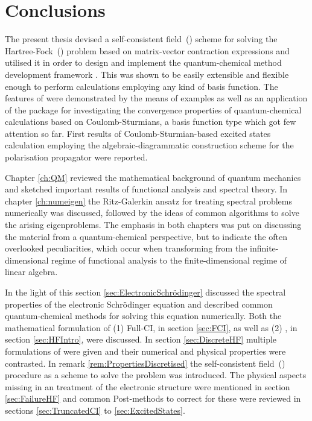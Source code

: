 \chapter{Conclusions}
\label{ch:Conclusion}

\noindent
The present thesis devised a self-consistent field~(\SCF)
scheme for solving the Hartree-Fock~(\HF) problem
based on matrix-vector contraction expressions
and utilised it in order to design and implement the
quantum-chemical method development framework \molsturm.
This was shown to be easily extensible and flexible enough
to perform calculations
employing any kind of basis function.
The features of \molsturm were demonstrated by the means
of examples as well as an application of the package for
investigating the convergence properties
of quantum-chemical calculations
based on Coulomb-Sturmians,
a basis function type which got few attention so far.
First results of Coulomb-Sturmian-based excited states
calculation employing the algebraic-diagrammatic construction scheme
for the polarisation propagator were reported.


Chapter \ref{ch:QM} reviewed the mathematical background of quantum mechanics
and sketched important results of functional analysis
and spectral theory.
In chapter \ref{ch:numeigen} the Ritz-Galerkin ansatz
for treating spectral problems numerically
was discussed, followed by the ideas of common algorithms
to solve the arising eigenproblems.
The emphasis in both chapters
was put on discussing the material from a quantum-chemical perspective,
but to indicate the often overlooked peculiarities,
which occur when transforming from the infinite-dimensional regime
of functional analysis to the finite-dimensional regime of linear algebra.


In the light of this section \ref{sec:ElectronicSchrödinger}
discussed the spectral properties
of the electronic Schrödinger equation and
described common quantum-chemical methods
for solving this equation numerically.
Both the mathematical formulation of (1) Full-CI, in section \ref{sec:FCI},
as well as (2) \HF, in section \ref{sec:HFIntro}, were discussed.
In section \ref{sec:DiscreteHF} multiple formulations of \HF were given
and their numerical and physical properties were contrasted.
In remark \ref{rem:PropertiesDiscretised}
the self-consistent field~(\SCF) procedure
as a scheme to solve the \HF problem was introduced.
The physical aspects missing in an \HF treatment of the electronic
structure were mentioned in section \ref{sec:FailureHF}
and common Post-\HF methods to correct for these were
reviewed in sections \ref{sec:TruncatedCI} to \ref{sec:ExcitedStates}.

